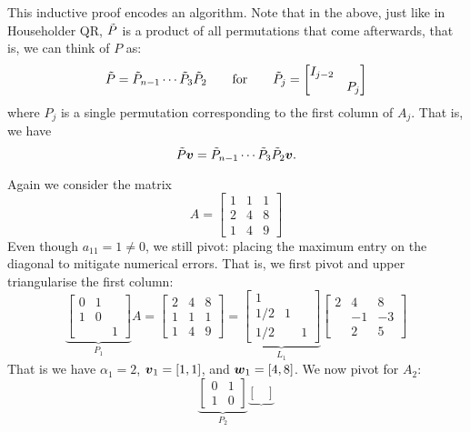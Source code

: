 This inductive proof encodes an  algorithm. Note that in the above, just like in Householder QR, ${\tilde P}$ is a product of all permutations that come afterwards, that is, we can think of $P$ as:
\[
{\tilde P} =  {\tilde P}_{n-1} \cdots {\tilde P}_3 {\tilde P}_2\qquad\hbox{for}\qquad {\tilde P}_j = \begin{bmatrix} I_{j-2} \\ & P_j \end{bmatrix}
\]
where $P_j$ is a single permutation corresponding to the first column of $A_j$.  That is, we have
\[
{\tilde P} \bm{{\mbox{\boldmath$v$\unboldmath}}} = {\tilde P}_{n-1} \cdots {\tilde P}_3 {\tilde P}_2 \bm{{\mbox{\boldmath$v$\unboldmath}}}.
\]
\begin{example} Again we consider the matrix
\[
A = \begin{bmatrix} 1 & 1 & 1 \\
                    2 & 4 & 8 \\
                    1 & 4 & 9
                    \end{bmatrix}
\]
Even though $a_{11} = 1 \ensuremath{\neq} 0$, we still pivot: placing  the maximum entry on the diagonal to mitigate numerical errors. That is, we first pivot and upper triangularise the first column:
\[
  \underbrace{\begin{bmatrix} 0 & 1 \\ 1 & 0 \\ && 1 \end{bmatrix}}_{P_1} A =  
\begin{bmatrix}  2 & 4 & 8 \\
                    1 & 1 & 1 \\
                    1 & 4 & 9
                    \end{bmatrix} = 
\underbrace{\begin{bmatrix}  1 &  \\
                    1/2 & 1 \\
                    1/2 &  & 1
                    \end{bmatrix}}_{L_1}
                    \begin{bmatrix}  2 & 4 & 8 \\
                     & -1 & -3 \\
                     & 2 & 5
                    \end{bmatrix}
\]
That is we have $\ensuremath{\alpha}_1 = 2$, $\bm{{\mbox{\boldmath$v$\unboldmath}}}_1 = [1,1]$, and $\bm{{\mbox{\boldmath$w$\unboldmath}}}_1 = [4,8]$. We now pivot for $A_2$:
\[
\underbrace{\begin{bmatrix} 0 & 1 \\ 1 & 0 \end{bmatrix}}_{P_2}  \underbrace{\begin{bmatrix}

\end{bmatrix}}\]
\end{example}

